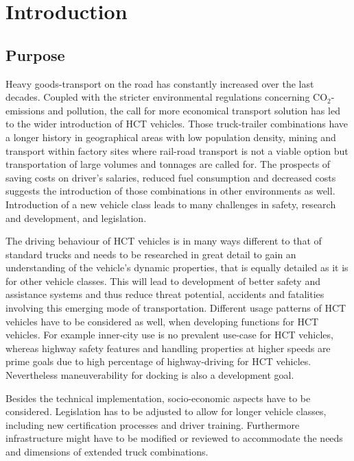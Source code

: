 \documentclass[ExampleMasters.tex]{subfiles}
\begin{document}
\clearpage
{\pagestyle{empty}\cleardoublepage}%
\chapter{Introduction}
\label{chap:introduction}

\section{Purpose}
\label{sec:purpose}
Heavy goods-transport on the road has constantly increased over the last decades. Coupled with the stricter environmental regulations concerning CO$_{2}$-emissions and pollution, the call for more economical transport solution has led to the wider introduction of \gls{HCT} vehicles. Those truck-trailer combinations have a longer history in geographical areas with low population density, mining and transport within factory sites where rail-road transport is not a viable option but transportation of large volumes and tonnages are called for. The prospects of saving costs on driver's salaries, reduced fuel consumption and decreased costs suggests the introduction of those combinations in other environments as well. Introduction of a new vehicle class leads to many challenges in safety, research and development, and legislation. 

The driving behaviour of \gls{HCT} vehicles is in many ways different to that of standard trucks and needs to be researched in great detail to gain an understanding of the vehicle's dynamic properties, that is equally detailed as it is for other vehicle classes. This will lead to development of better safety and assistance systems and thus reduce threat potential, accidents and fatalities involving this emerging mode of transportation. Different usage patterns of \gls{HCT} vehicles have to be considered as well, when developing functions for \gls{HCT} vehicles. For example inner-city use is no prevalent use-case for \gls{HCT} vehicles, whereas highway safety features and handling properties at higher speeds are prime goals due to high percentage of highway-driving for \gls{HCT} vehicles. Nevertheless maneuverability for docking is also a development goal.

Besides the technical implementation, socio-economic aspects have to be considered. Legislation has to be adjusted to allow for longer vehicle classes, including new certification processes and driver training. Furthermore infrastructure might have to be modified or reviewed to accommodate the needs and dimensions of extended truck combinations.
\end{document}
